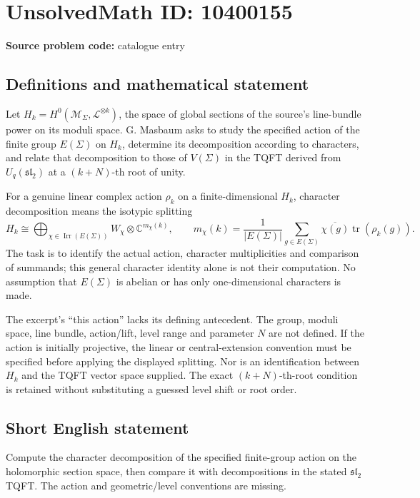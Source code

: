 \documentclass[11pt]{article}
\newcommand{\C}{\mathbb{C}}
\begin{document}
\section*{UnsolvedMath ID: 10400155}
\textbf{Source problem code:} catalogue entry
\subsection{Definitions and mathematical statement}
Let \(H_k=H^0(\mathcal M_\Sigma,\mathcal L^{\otimes k})\), the space of global sections of the source's line-bundle power on its moduli space. G. Masbaum asks to study the specified action of the finite group \(E(\Sigma)\) on \(H_k\), determine its decomposition according to characters, and relate that decomposition to those of \(V(\Sigma)\) in the TQFT derived from \(U_q(\mathfrak{sl}_2)\) at a \((k+N)\)-th root of unity.

For a genuine linear complex action \(\rho_k\) on a finite-dimensional \(H_k\), character decomposition means the isotypic splitting
\[
 H_k\cong\bigoplus_{\chi\in\operatorname{Irr}(E(\Sigma))}
 W_\chi\otimes\C^{m_\chi(k)},\qquad
 m_\chi(k)=\frac1{|E(\Sigma)|}\sum_{g\in E(\Sigma)}
 \overline{\chi(g)}\operatorname{tr}(\rho_k(g)).
\]
The task is to identify the actual action, character multiplicities and comparison of summands; this general character identity alone is not their computation. No assumption that \(E(\Sigma)\) is abelian or has only one-dimensional characters is made.

The excerpt's ``this action'' lacks its defining antecedent. The group, moduli space, line bundle, action/lift, level range and parameter \(N\) are not defined. If the action is initially projective, the linear or central-extension convention must be specified before applying the displayed splitting. Nor is an identification between \(H_k\) and the TQFT vector space supplied. The exact \((k+N)\)-th-root condition is retained without substituting a guessed level shift or root order.
\subsection{Short English statement}
Compute the character decomposition of the specified finite-group action on the holomorphic section space, then compare it with decompositions in the stated \(\mathfrak{sl}_2\) TQFT. The action and geometric/level conventions are missing.
\end{document}
